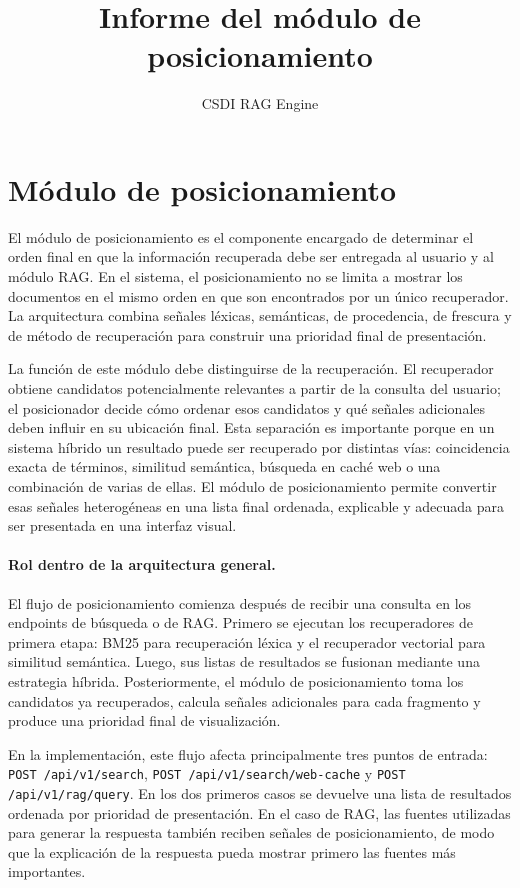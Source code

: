 \documentclass[11pt]{article}
\title{Informe del módulo de posicionamiento}
\author{CSDI RAG Engine}
\date{}
\begin{document}
\maketitle

\section{Módulo de posicionamiento}

El módulo de posicionamiento es el componente encargado de determinar el orden final en que la
información recuperada debe ser entregada al usuario y al módulo RAG. En el sistema, el
posicionamiento no se limita a mostrar los documentos en el mismo orden en que son encontrados
por un único recuperador. La arquitectura combina señales léxicas, semánticas, de procedencia,
de frescura y de método de recuperación para construir una prioridad final de presentación.

La función de este módulo debe distinguirse de la recuperación. El recuperador obtiene candidatos
potencialmente relevantes a partir de la consulta del usuario; el posicionador decide cómo ordenar
esos candidatos y qué señales adicionales deben influir en su ubicación final. Esta separación es
importante porque en un sistema híbrido un resultado puede ser recuperado por distintas vías:
coincidencia exacta de términos, similitud semántica, búsqueda en caché web o una combinación de
varias de ellas. El módulo de posicionamiento permite convertir esas señales heterogéneas en una
lista final ordenada, explicable y adecuada para ser presentada en una interfaz visual.

\paragraph{Rol dentro de la arquitectura general.}
El flujo de posicionamiento comienza después de recibir una consulta en los endpoints de búsqueda
o de RAG. Primero se ejecutan los recuperadores de primera etapa: BM25 para recuperación léxica y
el recuperador vectorial para similitud semántica. Luego, sus listas de resultados se fusionan
mediante una estrategia híbrida. Posteriormente, el módulo de posicionamiento toma los candidatos
ya recuperados, calcula señales adicionales para cada fragmento y produce una prioridad final de
visualización.

En la implementación, este flujo afecta principalmente tres puntos de entrada:
\texttt{POST /api/v1/search}, \texttt{POST /api/v1/search/web-cache} y
\texttt{POST /api/v1/rag/query}. En los dos primeros casos se devuelve una lista de resultados
ordenada por prioridad de presentación. En el caso de RAG, las fuentes utilizadas para generar la
respuesta también reciben señales de posicionamiento, de modo que la explicación de la respuesta
pueda mostrar primero las fuentes más importantes.
\end{document}
